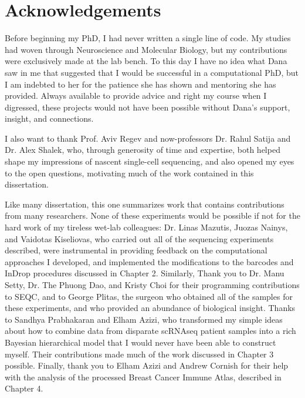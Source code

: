 
\cleartorecto %
\chapter{Acknowledgements} %
\thispagestyle{plain} %

Before beginning my PhD, I had never written a single line of code. 
My studies had woven through Neuroscience and Molecular Biology, but my contributions were exclusively made at the lab bench.  
To this day I have no idea what Dana saw in me that suggested that I would be successful in a computational PhD, but I am indebted to her for the patience she has shown and mentoring she has provided. 
Always available to provide advice and right my course when I digressed, these projects would not have been possible without Dana's support, insight, and connections.

I also want to thank Prof. Aviv Regev and now-professors Dr. Rahul Satija and Dr. Alex Shalek, who, through generosity of time and expertise, both helped shape my impressions of nascent single-cell sequencing, and also opened my eyes to the open questions, motivating much of the work contained in this dissertation. 

Like many dissertation, this one summarizes work that contains contributions from many researchers. 
None of these experiments would be possible if not for the hard work of my tireless wet-lab colleagues: Dr. Linas Mazutis, Juozas Nainys, and Vaidotas Kiseliovas, who carried out all of the sequencing experiments described, were instrumental in providing feedback on the computational approaches I developed, and implemented the modifications to the barcodes and InDrop procedures discussed in Chapter 2. 
Similarly, Thank you to Dr. Manu Setty, Dr. The Phuong Dao, and Kristy Choi for their programming contributions to SEQC, and to George Plitas, the surgeon who obtained all of the samples for these experiments, and who provided an abundance of biological insight. 
Thanks to Sandhya Prabhakaran and Elham Azizi, who transformed my simple ideas about how to combine data from disparate scRNAseq patient samples into a rich Bayesian hierarchical model that I would never have been able to construct myself. Their contributions made much of the work discussed in Chapter 3 possible.  
Finally, thank you to Elham Azizi and Andrew Cornish for their help with the analysis of the processed Breast Cancer Immune Atlas, described in Chapter 4.  

